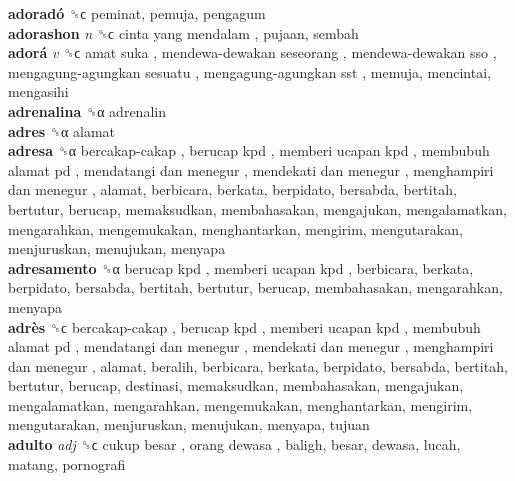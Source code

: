 \textbf{adoradó} ␝ϲ  peminat, pemuja, pengagum  \\
\textbf{adorashon} \emph{n}  ␝ϲ   cinta yang mendalam , pujaan, sembah  \\
\textbf{adorá} \emph{v}  ␝ϲ   amat suka ,  mendewa-dewakan seseorang ,  mendewa-dewakan sso ,  mengagung-agungkan sesuatu ,  mengagung-agungkan sst , memuja, mencintai, mengasihi  \\
\textbf{adrenalina} ␝α  adrenalin  \\
\textbf{adres} ␝α  alamat  \\
\textbf{adresa} ␝α   bercakap-cakap ,  berucap kpd ,  memberi ucapan kpd ,  membubuh alamat pd ,  mendatangi dan menegur ,  mendekati dan menegur ,  menghampiri dan menegur , alamat, berbicara, berkata, berpidato, bersabda, bertitah, bertutur, berucap, memaksudkan, membahasakan, mengajukan, mengalamatkan, mengarahkan, mengemukakan, menghantarkan, mengirim, mengutarakan, menjuruskan, menujukan, menyapa  \\
\textbf{adresamento} ␝α   berucap kpd ,  memberi ucapan kpd , berbicara, berkata, berpidato, bersabda, bertitah, bertutur, berucap, membahasakan, mengarahkan, menyapa  \\
\textbf{adrès} ␝ϲ   bercakap-cakap ,  berucap kpd ,  memberi ucapan kpd ,  membubuh alamat pd ,  mendatangi dan menegur ,  mendekati dan menegur ,  menghampiri dan menegur , alamat, beralih, berbicara, berkata, berpidato, bersabda, bertitah, bertutur, berucap, destinasi, memaksudkan, membahasakan, mengajukan, mengalamatkan, mengarahkan, mengemukakan, menghantarkan, mengirim, mengutarakan, menjuruskan, menujukan, menyapa, tujuan  \\
\textbf{adulto} \emph{adj}  ␝ϲ   cukup besar ,  orang dewasa , baligh, besar, dewasa, lucah, matang, pornografi  \\
